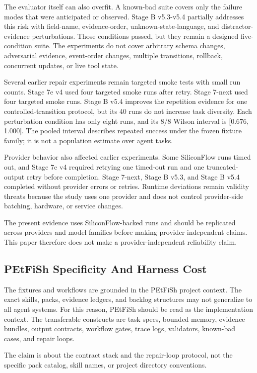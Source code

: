 \documentclass[11pt]{article}
\begin{document}
The evaluator itself can also overfit. A known-bad suite covers only the failure modes that were anticipated or observed. Stage B v5.3-v5.4 partially addresses this risk with field-name, evidence-order, unknown-state-language, and distractor-evidence perturbations. Those conditions passed, but they remain a designed five-condition suite. The experiments do not cover arbitrary schema changes, adversarial evidence, event-order changes, multiple transitions, rollback, concurrent updates, or live tool state.

Several earlier repair experiments remain targeted smoke tests with small run counts. Stage 7e v4 used four targeted smoke runs after retry. Stage 7-next used four targeted smoke runs. Stage B v5.4 improves the repetition evidence for one controlled-transition protocol, but its 40 runs do not increase task diversity. Each perturbation condition has only eight runs, and its 8/8 Wilson interval is [0.676, 1.000]. The pooled interval describes repeated success under the frozen fixture family; it is not a population estimate over agent tasks.

Provider behavior also affected earlier experiments. Some SiliconFlow runs timed out, and Stage 7e v4 required retrying one timed-out run and one truncated-output retry before completion. Stage 7-next, Stage B v5.3, and Stage B v5.4 completed without provider errors or retries. Runtime deviations remain validity threats because the study uses one provider and does not control provider-side batching, hardware, or service changes.

The present evidence uses SiliconFlow-backed runs and should be replicated across providers and model families before making provider-independent claims. This paper therefore does not make a provider-independent reliability claim.

\subsection{PEtFiSh Specificity And Harness Cost}

The fixtures and workflows are grounded in the PEtFiSh project context. The exact skills, packs, evidence ledgers, and backlog structures may not generalize to all agent systems. For this reason, PEtFiSh should be read as the implementation context. The transferable constructs are task specs, bounded memory, evidence bundles, output contracts, workflow gates, trace logs, validators, known-bad cases, and repair loops.

The claim is about the contract stack and the repair-loop protocol, not the specific pack catalog, skill names, or project directory conventions.
\end{document}
